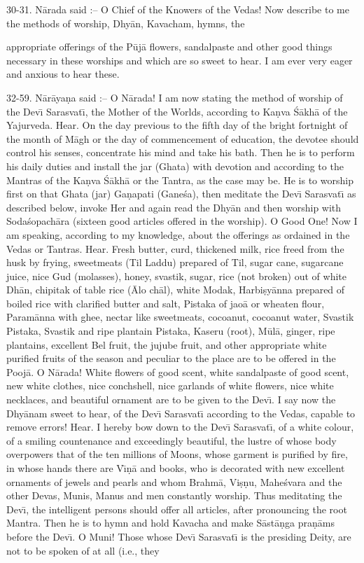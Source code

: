 30-31. N\=arada said :-- O Chief of the Knowers of the Vedas! Now describe to me the methods of worship, Dhy\=an, Kavacham, hymns, the

appropriate offerings of the P\=uj\=a flowers, sandalpaste and other good things necessary in these worships and which are so sweet to hear. I am ever very eager and anxious to hear these.

32-59. N\=ar\=aya\d{n}a said :-- O N\=arada! I am now stating the method of worship of the Dev\={\i} Sarasvat\={\i}, the Mother of the Worlds, according to Ka\d{n}va \'S\=akh\=a of the Yajurveda. Hear. On the day previous to the fifth day of the bright fortnight of the month of M\=agh or the day of commencement of education, the devotee should control his senses, concentrate his mind and take his bath. Then he is to perform his daily duties and install the jar (Ghata) with devotion and according to the Mantras of the Ka\d{n}va \'S\=akh\=a or the Tantra, as the case may be. He is to worship first on that Ghata (jar) Ga\d{n}apati (Gane\'sa), then meditate the Dev\={\i} Sarasvat\={\i} as described below, invoke Her and again read the Dhy\=an and then worship with Soda\'sopach\=ara (sixteen good articles offered in the worship). O Good One! Now I am speaking, according to my knowledge, about the offerings as ordained in the Vedas or Tantras. Hear. Fresh butter, curd, thickened milk, rice freed from the husk by frying, sweetmeats (Til Laddu) prepared of Til, sugar cane, sugarcane juice, nice Gud (molasses), honey, svastik, sugar, rice (not broken) out of white Dh\=an, chipitak of table rice (\=Alo ch\=al), white Modak, Harbi\d{s}y\=anna prepared of boiled rice with clarified butter and salt, Pistaka of jao\=a or wheaten flour, Param\=anna with ghee, nectar like sweetmeats, cocoanut, cocoanut water, Svastik Pistaka, Svastik and ripe plantain Pistaka, Kaseru (root), M\=ul\=a, ginger, ripe plantains, excellent Bel fruit, the jujube fruit, and other appropriate white purified fruits of the season and peculiar to the place are to be offered in the Pooj\=a. O N\=arada! White flowers of good scent, white sandalpaste of good scent, new white clothes, nice conchshell, nice garlands of white flowers, nice white necklaces, and beautiful ornament are to be given to the Dev\={\i}. I say now the Dhy\=anam sweet to hear, of the Dev\={\i} Sarasvat\={\i} according to the Vedas, capable to remove errors! Hear. I hereby bow down to the Dev\={\i} Sarasvat\={\i}, of a white colour, of a smiling countenance and exceedingly beautiful, the lustre of whose body overpowers that of the ten millions of Moons, whose garment is purified by fire, in whose hands there are V\={\i}\d{n}\=a and books, who is decorated with new excellent ornaments of jewels and pearls and whom Brahm\=a, Vi\d{s}\d{n}u, Mahe\'svara and the other Devas, Munis, Manus and men constantly worship. Thus meditating the Dev\={\i}, the intelligent persons should offer all articles, after pronouncing the root Mantra. Then he is to hymn and hold Kavacha and make S\=ast\=a\d{n}ga pra\d{n}\=ams before the Dev\={\i}. O Muni! Those whose Dev\={\i} Sarasvat\={\i} is the presiding Deity, are not to be spoken of at all (i.e., they

